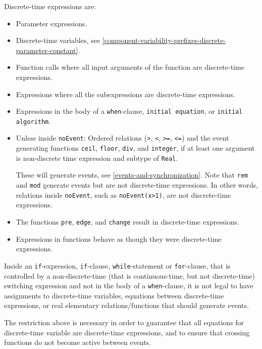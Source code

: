 Discrete-time expressions are:
\begin{itemize}
\item
  Parameter expressions.
\item
  Discrete-time variables, see \cref{component-variability-prefixes-discrete-parameter-constant}.
\item
  Function calls where all input arguments of the function are discrete-time expressions.
\item
  Expressions where all the subexpressions are discrete-time expressions.
\item
  Expressions in the body of a \lstinline!when!-clause, \lstinline!initial equation!, or \lstinline!initial algorithm!.
\item
  Unless inside \lstinline!noEvent!: Ordered relations (\lstinline!>!, \lstinline!<!, \lstinline!>=!, \lstinline!<=!) and the event generating functions \lstinline!ceil!, \lstinline!floor!, \lstinline!div!, and \lstinline!integer!, if at least one argument is non-discrete time expression and subtype of \lstinline!Real!.
  \begin{nonnormative}
  These will generate events, see \cref{events-and-synchronization}.
  Note that \lstinline!rem! and \lstinline!mod! generate events but are not discrete-time expressions.
  In other words, relations inside \lstinline!noEvent!, such as \lstinline!noEvent(x>1)!, are not discrete-time expressions.
  \end{nonnormative}
\item
  The functions \lstinline!pre!, \lstinline!edge!, and \lstinline!change! result in discrete-time expressions.
\item
  Expressions in functions behave as though they were discrete-time expressions.
\end{itemize}

Inside an \lstinline!if!-expression, \lstinline!if!-clause, \lstinline!while!-statement or \lstinline!for!-clause, that is controlled by a non-discrete-time (that is continuous-time, but not discrete-time) switching expression and not in the body of a \lstinline!when!-clause, it is not legal to have assignments to discrete-time variables, equations between discrete-time expressions, or real elementary relations/functions that should generate events.

\begin{nonnormative}
The restriction above is necessary in order to guarantee that all equations for discrete-time variable are discrete-time expressions, and to ensure that crossing functions do not become active between events.
\end{nonnormative}

